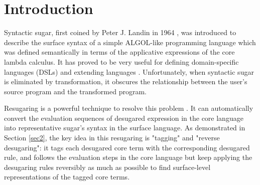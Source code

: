 \section{Introduction}









Syntactic sugar, first coined by Peter J. Landin in 1964 \cite{syntacticsugar}, was introduced to describe the surface syntax of a simple ALGOL-like programming language which was defined semantically in terms of the applicative expressions of the core lambda calculus. It has proved to be very useful for defining domain-specific languages (DSLs) and extending languages \cite{FellFFKBMT18,CulpFFK19}.
Unfortunately, when syntactic sugar is eliminated by transformation, it obscures the relationship between the user’s source program and the transformed program.



Resugaring is a powerful technique to resolve this problem \cite{resugaring,hygienic}. It  can automatically convert the evaluation sequences of desugared expression in the core language into representative sugar's syntax in the surface language.
As demonstrated in Section \ref{sec2},
the key idea in this resugaring is "tagging" and "reverse desugaring": it tags each desugared core term with the corresponding desugared rule, and follows the evaluation steps in the core language but keep applying the desugaring rules reversibly as much as possible to find surface-level representations of the tagged core terms.

